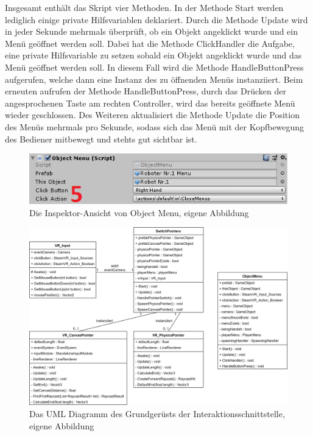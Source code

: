 \newline
Insgesamt enthält das Skript vier Methoden. In der Methode Start werden lediglich einige private Hilfsvariablen deklariert. Durch die Methode Update wird in jeder Sekunde mehrmals überprüft, ob ein Objekt angeklickt wurde und ein Menü geöffnet werden soll. Dabei hat die Methode ClickHandler die Aufgabe, eine private Hilfsvariable zu setzen sobald ein Objekt angeklickt wurde und das Menü geöffnet werden soll. In diesem Fall wird die Methode HandleButtonPress aufgerufen, welche dann eine Instanz des zu öffnenden Menüs instanziiert. Beim erneuten aufrufen der Methode HandleButtonPress, durch das Drücken der angesprochenen Taste am rechten Controller, wird das bereits geöffnete Menü wieder geschlossen. Des Weiteren aktualisiert die Methode Update die Position des Menüs mehrmals pro Sekunde, sodass sich das Menü mit der Kopfbewegung des Bediener mitbewegt und stehts gut sichtbar ist.
\begin{figure}[h]
	\centering
	\includegraphics[width=0.6\linewidth]{Bilder/A46_ObjectMenu2}
	\caption{Die Inspektor-Ansicht von Object Menu, eigene Abbildung}
	\label{fig:ObjectMenu}
\end{figure}
\begin{figure}[h]
	\centering
	\includegraphics[width=1\linewidth]{Bilder/A48_InteraktionUML1}
	\caption{Das UML Diagramm des Grundgerüsts der Interaktionsschnittstelle, eigene Abbildung}
	\label{fig:UMLInteraktion}
\end{figure}

